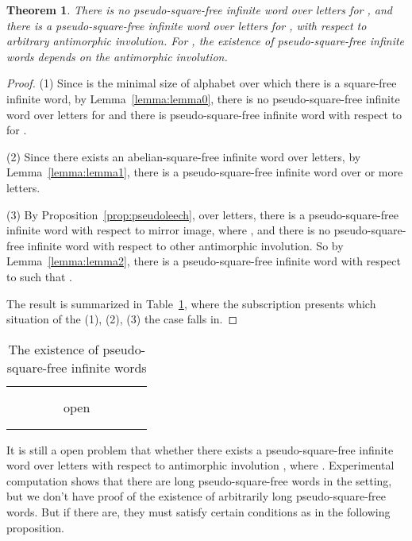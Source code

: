 \documentclass[12pt]{article}
\newtheorem{theorem}{Theorem}
\begin{document}
\begin{theorem}
There is no pseudo-square-free infinite word over  letters for
, and there is a pseudo-square-free infinite word over 
letters for , with respect to arbitrary antimorphic
involution. For , the existence of pseudo-square-free
infinite words depends on the antimorphic involution.
\end{theorem}
\begin{proof}
(1) Since  is the minimal size of alphabet over which there is a
square-free infinite word, by Lemma~\ref{lemma:lemma0}, there is no
pseudo-square-free infinite word over  letters for  and
there is pseudo-square-free infinite word with respect to 
for .

(2) Since there exists an abelian-square-free infinite word over 
letters, by Lemma~\ref{lemma:lemma1}, there is a pseudo-square-free
infinite word over  or more letters.

(3) By Proposition~\ref{prop:pseudoleech}, over  letters, there
is a pseudo-square-free infinite word with respect to mirror image,
where , and there is no
pseudo-square-free infinite word with respect to other antimorphic
involution. So by Lemma~\ref{lemma:lemma2}, there is a
pseudo-square-free infinite word with respect to  such that
.

The result is summarized in Table~\ref{table:pseudosquare}, where
the subscription presents which situation of the (1), (2), (3) the
case falls in.
\end{proof}

\begin{table}
\centering \caption{The existence of pseudo-square-free infinite
words}
\begin{tabular}{c|p{5.5ex}p{5.5ex}p{5.5ex}p{5.5ex}p{5.5ex}p{5.5ex}p{5.5ex}p{5.5ex}}
  \hline
 &  &  &  &  &  &  &  &  \\
  \hline
   &  &  &  &  &  &  &  &  \\
   &  &  &  &  &  &  &  &  \\
   &  &  &  & {\small open} &  &  &  &  \\
   &  &  &  &  &  &  &  &  \\
   &  &  &  &  &  &  &  &  \\
  \hline
\end{tabular}\label{table:pseudosquare}
\end{table}


It is still a open problem that whether there exists a
pseudo-square-free infinite word over  letters with respect to
antimorphic involution , where . Experimental
computation shows that there are long pseudo-square-free words in
the setting, but we don't have proof of the existence of arbitrarily
long pseudo-square-free words. But if there are, they must satisfy
certain conditions as in the following proposition.
\end{document}
